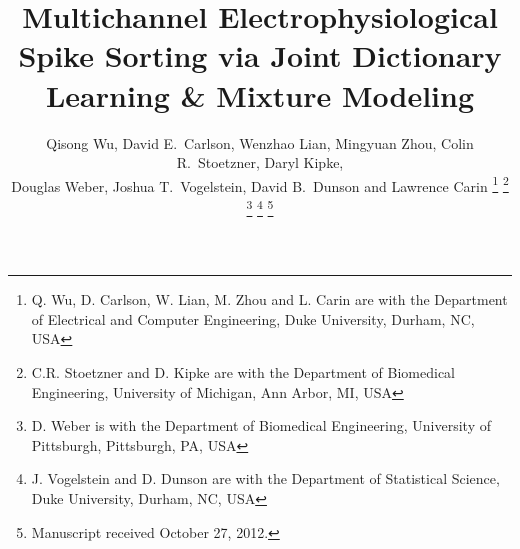 \documentclass[journal]{IEEEtran}
\begin{document}

%
\title{
{Multichannel Electrophysiological Spike Sorting via Joint Dictionary Learning \& Mixture Modeling}
}%
%
%

\author{Qisong Wu, David E.~Carlson, Wenzhao Lian, Mingyuan Zhou, Colin R.~Stoetzner, Daryl Kipke, \\ Douglas Weber, Joshua T.~Vogelstein, David B.~Dunson and Lawrence Carin%
\thanks{Q. Wu, D. Carlson, W. Lian, M. Zhou and L. Carin are with the Department
of Electrical and Computer Engineering, Duke University, Durham, NC, USA}%
\thanks{C.R. Stoetzner and D. Kipke are with the Department of Biomedical Engineering, University of Michigan, Ann Arbor, MI, USA}%
\thanks{D. Weber is with the Department of Biomedical Engineering, University of Pittsburgh, Pittsburgh, PA, USA}%
\thanks{J. Vogelstein and D. Dunson are with the Department of Statistical Science, Duke University, Durham, NC, USA}
\thanks{Manuscript received October 27, 2012.}}

%
%
\end{document}
